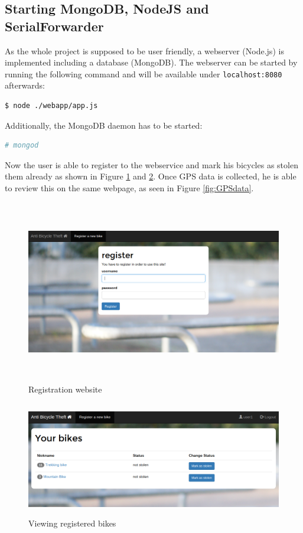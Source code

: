 \documentclass[a4paper]{article}
\begin{document}
\subsection{Starting MongoDB, NodeJS and SerialForwarder}
As the whole project is supposed to be user friendly, a webserver (Node.js) is implemented including a database (MongoDB).
The webserver can be started by running the following command and will be available under \texttt{localhost:8080} afterwards:
\begin{lstlisting}[frame=single,language=bash]
$ node ./webapp/app.js
\end{lstlisting}
Additionally, the MongoDB daemon has to be started:
\begin{lstlisting}[frame=single,language=bash]
# mongod
\end{lstlisting}
Now the user is able to register to the webservice and mark his bicycles as stolen them already as shown in Figure \ref{fig:webregistration} and \ref{fig:mark}. Once GPS data is collected, he is able to review this on the same webpage, as seen in Figure \ref{fig:GPSdata}.
\begin{figure}[h!]
\begin{center}
\includegraphics[keepaspectratio=false, width=12cm, height=8cm]{pics/reg.png}
\end{center}
\caption{Registration website}
\label{fig:webregistration}
\end{figure}
\begin{figure}
\begin{center}
\includegraphics[keepaspectratio=false, width=12cm, height=5cm]{pics/mark.png}
\end{center}
\caption{Viewing registered bikes}
\label{fig:mark}
\end{figure}
\end{document}
